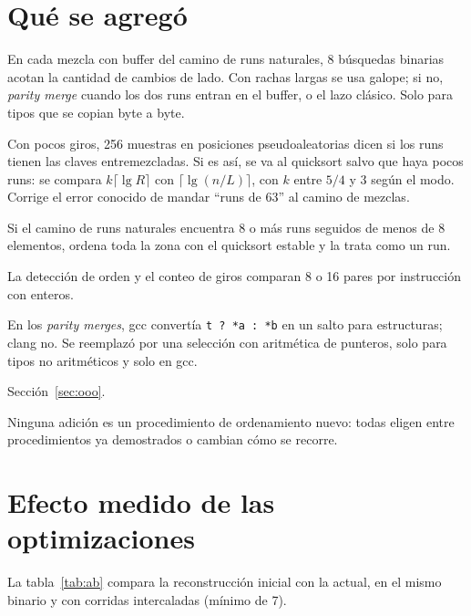 \documentclass[10pt,a4paper]{article}
\begin{document}
\section{Qué se agregó}
\begin{description}[leftmargin=1.2em,itemsep=2pt]
\item[Sonda de rachas.] En cada mezcla con buffer del camino de runs naturales, 8
  búsquedas binarias acotan la cantidad de cambios de lado. Con rachas largas se usa
  galope; si no, \emph{parity merge} cuando los dos runs entran en el buffer, o el lazo
  clásico. Solo para tipos que se copian byte a byte.
\item[Sonda de orden global y regla de ruta.] Con pocos giros, 256 muestras en
  posiciones pseudoaleatorias dicen si los runs tienen las claves entremezcladas. Si es
  así, se va al quicksort salvo que haya pocos runs: se compara
  $k\lceil\lg R\rceil$ con $\lceil\lg(n/L)\rceil$, con $k$ entre $5/4$ y $3$ según el
  modo. Corrige el error conocido de mandar ``runs de 63'' al camino de mezclas.
\item[Zonas desordenadas.] Si el camino de runs naturales encuentra 8 o más runs
  seguidos de menos de 8 elementos, ordena toda la zona con el quicksort estable y la
  trata como un run.
\item[Recorridos vectoriales.] La detección de orden y el conteo de giros comparan 8 o
  16 pares por instrucción con enteros.
\item[Selección sin salto en gcc.] En los \emph{parity merges}, gcc convertía
  \texttt{t ? *a : *b} en un salto para estructuras; clang no. Se reemplazó por una
  selección con aritmética de punteros, solo para tipos no aritméticos y solo en gcc.
\item[Planificador experimental.] Sección~\ref{sec:ooo}.
\end{description}
Ninguna adición es un procedimiento de ordenamiento nuevo: todas eligen entre
procedimientos ya demostrados o cambian cómo se recorre.

\section{Efecto medido de las optimizaciones}
La tabla~\ref{tab:ab} compara la reconstrucción inicial con la actual, en el mismo
binario y con corridas intercaladas (mínimo de 7).
\end{document}
